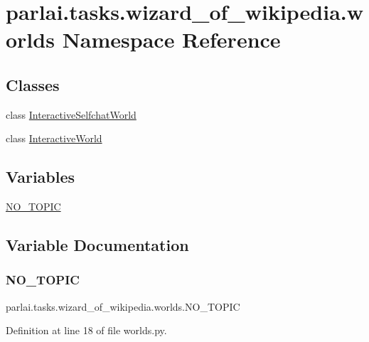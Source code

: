 \hypertarget{namespaceparlai_1_1tasks_1_1wizard__of__wikipedia_1_1worlds}{}\section{parlai.\+tasks.\+wizard\+\_\+of\+\_\+wikipedia.\+worlds Namespace Reference}
\label{namespaceparlai_1_1tasks_1_1wizard__of__wikipedia_1_1worlds}
\subsection*{Classes}
\begin{DoxyCompactItemize}
\item 
class \hyperlink{classparlai_1_1tasks_1_1wizard__of__wikipedia_1_1worlds_1_1InteractiveSelfchatWorld}{Interactive\+Selfchat\+World}
\item 
class \hyperlink{classparlai_1_1tasks_1_1wizard__of__wikipedia_1_1worlds_1_1InteractiveWorld}{Interactive\+World}
\end{DoxyCompactItemize}
\subsection*{Variables}
\begin{DoxyCompactItemize}
\item 
\hyperlink{namespaceparlai_1_1tasks_1_1wizard__of__wikipedia_1_1worlds_a3eb1939bb3f2c7969833d1a3d2ba5ea2}{N\+O\+\_\+\+T\+O\+P\+IC}
\end{DoxyCompactItemize}


\subsection{Variable Documentation}
\mbox{\label{namespaceparlai_1_1tasks_1_1wizard__of__wikipedia_1_1worlds_a3eb1939bb3f2c7969833d1a3d2ba5ea2}} 
\subsubsection{\texorpdfstring{N\+O\+\_\+\+T\+O\+P\+IC}{NO\_TOPIC}}
{\footnotesize\ttfamily parlai.\+tasks.\+wizard\+\_\+of\+\_\+wikipedia.\+worlds.\+N\+O\+\_\+\+T\+O\+P\+IC}



Definition at line 18 of file worlds.\+py.

